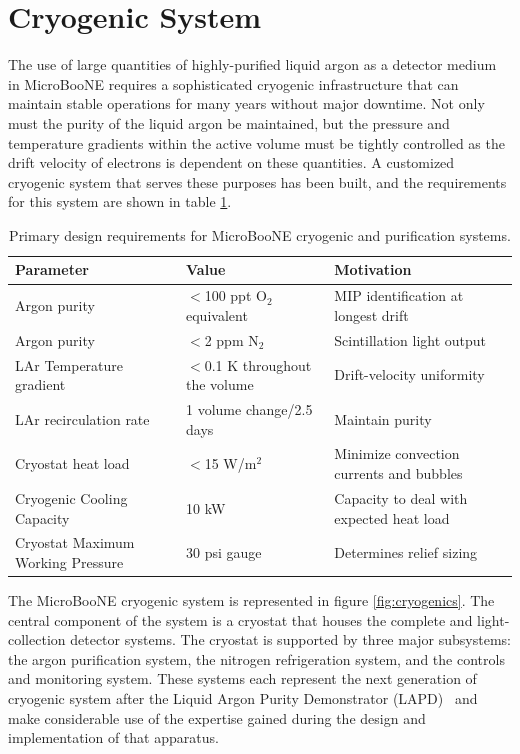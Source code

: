 \section{Cryogenic System}
\label{sec:cryostat}

The use of large quantities of highly-purified liquid argon as a detector medium in MicroBooNE requires a sophisticated cryogenic infrastructure that can maintain stable operations for many years without major downtime.  Not only must the purity of the liquid argon be maintained, but the pressure and temperature gradients within the \lartpc active volume must be tightly controlled as the drift velocity of electrons is dependent on these quantities.  A customized cryogenic system that serves these purposes has been built, and the requirements for this system are shown in table \ref{tab:cryoreq}.

\begin{table}[!htb]
   \centering
    \caption{Primary design requirements for MicroBooNE cryogenic and purification systems.} 
    \begin{tabular}{lll} %
    \hline
    Parameter & Value & Motivation\\
    \hline
      Argon purity    & $<$100 ppt O$_2$ equivalent & MIP identification at longest drift\\
      Argon purity    & $<$2 ppm N$_2$ & Scintillation light output\\
      LAr Temperature gradient & $<$0.1 K throughout the volume & Drift-velocity uniformity\\
      LAr recirculation rate & 1 volume change/2.5 days & Maintain purity\\
      Cryostat heat load & $<$15 W/m$^2$ & Minimize convection currents and bubbles\\
      Cryogenic Cooling Capacity & 10 kW & Capacity to deal with expected heat load\\
      Cryostat Maximum Working Pressure & 30 psi gauge & Determines relief sizing\\
            \hline
   \end{tabular}
   \label{tab:cryoreq}
\end{table} 

The MicroBooNE cryogenic system is represented in figure \ref{fig:cryogenics}.  The central component of the system is a cryostat that houses the complete \lartpc and light-collection detector systems.  The cryostat is supported by three major subsystems: the argon purification system, the nitrogen refrigeration system, and the controls and monitoring system.  These systems each represent the next generation of \lartpc cryogenic system after the Liquid Argon Purity Demonstrator (LAPD)~\cite{Adamowski:2014-LAPD} and make considerable use of the expertise gained during the design and implementation of that apparatus.  %

